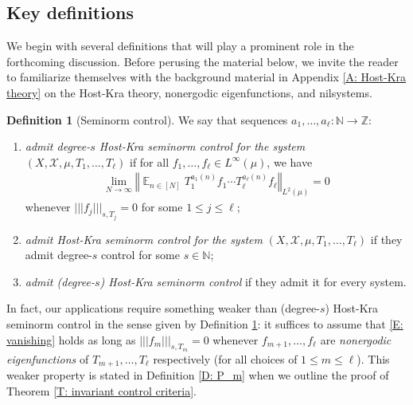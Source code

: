 \documentclass[11pt]{amsart}
\theoremstyle{definition}
\newtheorem{definition}[lemma]{Definition}
\DeclareMathOperator*{\E}{\mathbb{E}}
\newcommand{\N}{{\mathbb N}}
\newcommand{\Z}{{\mathbb Z}}
\newcommand{\CE}{{\mathcal E}}
\newcommand{\CX}{{\mathcal X}}
\newcommand{\norm}[1]{\left\Vert #1\right\Vert}
\newcommand{\nnorm}[1]{\lvert\!|\!| #1|\!|\!\rvert}
\newcommand{\1}{{\mathbf{1}}}
\begin{document}
\subsection{Key definitions}
We begin with several definitions that will play a prominent role in the forthcoming discussion. Before perusing the material below, we invite the reader to familiarize themselves with the background material in Appendix \ref{A: Host-Kra theory} on the Host-Kra theory, nonergodic eigenfunctions, and nilsystems.
\begin{definition}[Seminorm control]\label{D: seminorm control}
We say that sequences $a_1,\ldots,a_\ell\colon \N\to \Z$:
    \begin{enumerate}
        \item \label{i:local-seminorms} {\em admit degree-$s$ Host-Kra seminorm control for the system  $(X, \CX, \mu,T_1,\ldots, T_\ell)$} if for all  $f_1,\ldots, f_\ell\in L^\infty(\mu)$, we have
\begin{align}\label{E: vanishing}
    \lim_{N\to\infty}\norm{\E_{n\in[N]} T_1^{a_1(n)}f_1\cdots T_\ell^{a_\ell(n)}f_\ell}_{L^2(\mu)} = 0
\end{align}        
whenever $\nnorm{f_j}_{s, T_j} = 0$ for some $1\leq j\leq \ell$;
\item \emph{admit  Host-Kra seminorm control for the system}  $(X, \CX, \mu,T_1,\ldots, T_\ell)$ if they admit degree-$s$ control for some $s\in\N$;
\item \emph{admit (degree-$s$) Host-Kra seminorm control} if they admit it for every system.
    \end{enumerate}
\end{definition}
In fact, our applications require something weaker than (degree-$s$) Host-Kra seminorm control in the sense given by Definition \ref{D: seminorm control}: it suffices to assume that \eqref{E: vanishing} holds as long as $\nnorm{f_m}_{s, T_m} = 0$ whenever $f_{m+1}, \ldots, f_\ell$ are \emph{nonergodic eigenfunctions} of $T_{m+1}, \ldots, T_\ell$ respectively (for all choices of $1\leq m \leq \ell$). This weaker property is stated in Definition \ref{D: P_m} when we outline the proof of Theorem \ref{T: invariant control criteria}. 

\end{document}
